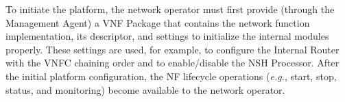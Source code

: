 
To initiate the platform, the network operator must first provide (through the Management Agent) a VNF Package that contains the network function implementation, its descriptor, and settings to initialize the internal modules properly. These settings are used, for example, to configure the Internal Router with the VNFC chaining order and to enable/disable the NSH Processor. After the initial platform configuration, the NF lifecycle operations (\textit{e.g.}, start, stop, status, and monitoring) become available to the network operator.




